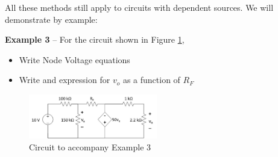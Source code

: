 \documentclass{handout}
\begin{document}
All these methods still apply to circuits with dependent sources.  We will demonstrate by example:

\textbf{Example 3} -- For the circuit shown in Figure \ref{fig: Example3},
\begin{itemize}
\item Write Node Voltage equations
\item Write and expression for $v_o$ as a function of $R_F$
\end{itemize}
\begin{figure}[h! t! b!]
\centering
\includegraphics[width=0.5\textwidth]{Example3.jpg}
\caption{Circuit to accompany Example 3}
\label{fig: Example3}
\end{figure}
\end{document}
